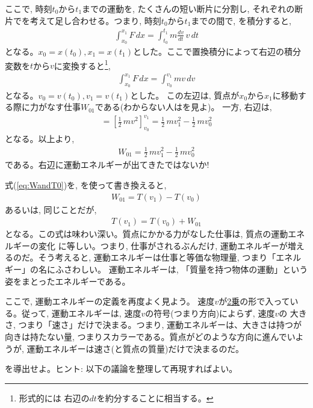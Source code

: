 ここで, 時刻$t_0$から$t_1$までの運動を, たくさんの短い断片に分割し, 
それぞれの断片でを考えて足し合わせる。つまり, 
時刻$t_0$から$t_1$までの間で, を積分すると, 
\begin{eqnarray} 
\int_{x_0}^{x_1}F\,dx=\int_{t_0}^{t_1}m\frac{dv}{dt}\,v\,dt\label{eq:WandT00s}
\end{eqnarray} 
となる。$x_0=x(t_0), x_1=x(t_1)$とした。ここで置換積分によって右辺の積分変数を$t$から$v$に変換すると\footnote{形式的には
右辺の$dt$を約分することに相当する。}, 
\begin{eqnarray} 
\int_{x_0}^{x_1}F\,dx=\int_{v_0}^{v_1}mv\,dv
\end{eqnarray} 
となる。$v_0=v(t_0), v_1=v(t_1)$とした。
この左辺は, 質点が$x_0$から$x_1$に移動する際に力がなす仕事$W_{01}$である(わからない人はを見よ)。
一方, 右辺は, 
\begin{eqnarray}=\left[\frac{1}{2}\,mv^2\right]_{v_0}^{v_1}=\frac{1}{2}\,mv_1^2-\frac{1}{2}\,mv_0^2\end{eqnarray}
となる。以上より, 
\begin{eqnarray} 
W_{01}=\frac{1}{2}\,mv_1^2-\frac{1}{2}\,mv_0^2\label{eq:WandT0}
\end{eqnarray} 
である。右辺に運動エネルギーが出てきたではないか!

式(\ref{eq:WandT0})を, を使って書き換えると, 
\begin{eqnarray} 
W_{01}=T(v_1)-T(v_0)\label{eq:WandT2}
\end{eqnarray} 
あるいは, 同じことだが, 
\begin{eqnarray} 
T(v_1)=T(v_0)+W_{01}\label{eq:TandW2}
\end{eqnarray} 
となる。この式は味わい深い。質点にかかる力がなした仕事は, 質点の運動エネルギーの変化
に等しい。つまり, 仕事がされるぶんだけ, 運動エネルギーが増えるのだ。そう考えると, 
運動エネルギーは仕事と等価な物理量, つまり「エネルギー」の名にふさわしい。
運動エネルギーは, 「質量を持つ物体の運動」という姿をまとったエネルギーである。\mv

ここで, 運動エネルギーの定義を再度よく見よう。
速度$v$が\underline{2乗}の形で入っている。従って, 運動エネルギーは, 速度$v$の符号(つまり方向)によらず, 速度$v$の
大きさ, つまり「速さ」だけで決まる。つまり, 運動エネルギーは、大きさは持つが
向きは持たない量, つまりスカラーである。質点がどのような方向に進んでいようが, 
運動エネルギーは速さ(と質点の質量)だけで決まるのだ。\mv
%

\begin{q}\label{q:principle_energy} を導出せよ。ヒント: 
以下の議論を整理して再現すればよい。\end{q}


